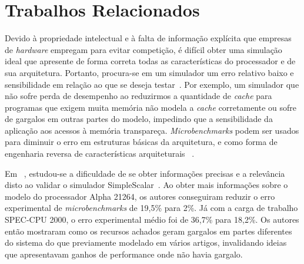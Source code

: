 \documentclass[12pt]{article}
\begin{document}
\vspace{-2mm}
\section{Trabalhos Relacionados}\label{related}

Devido à propriedade intelectual e à falta de informação explícita que empresas de \mbox{\textit{hardware}} empregam para evitar competição, é difícil obter uma simulação ideal que apresente de forma correta todas as características do processador e de sua arquitetura.
Portanto, procura-se em um simulador um erro relativo baixo e sensibilidade em relação ao que se deseja testar~\cite{eeckhout2010computer}. 
Por exemplo, um simulador que não sofre perda de desempenho ao reduzirmos a quantidade de \textit{cache} para programas que exigem muita memória não modela a \textit{cache} corretamente ou sofre de gargalos em outras partes do modelo, impedindo que a sensibilidade da aplicação aos acessos à memória transpareça.
\emph{Microbenchmarks} podem ser usados para diminuir o erro em estruturas básicas da arquitetura, e como forma de engenharia reversa de características arquiteturais ~\cite{fog2012microarchitecture}.


\vspace{-2mm}
Em ~\cite{desikan2001measuring}, estudou-se a dificuldade de se obter informações precisas e a relevância disto ao validar o simulador SimpleScalar~\cite{austin2002simplescalar}.
Ao obter mais informações sobre o modelo do processador Alpha 21264, os autores conseguiram reduzir o erro experimental de \textit{microbenchmarks} de 19,5\% para 2\%. 
Já com a carga de trabalho SPEC-CPU 2000, o erro experimental médio foi de 36,7\% para 18,2\%.
Os autores então mostraram como os recursos achados geram gargalos em partes diferentes do sistema do que previamente modelado em vários artigos, invalidando ideias que apresentavam ganhos de performance onde não havia gargalo.
\end{document}
